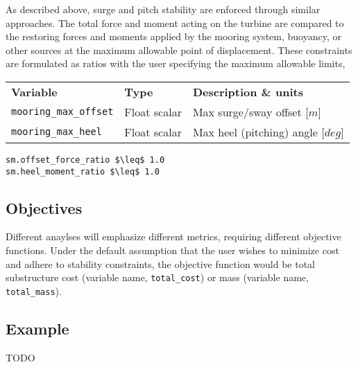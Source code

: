 As described above, surge and pitch stability are enforced through
similar approaches.  The total force and moment acting on the turbine
are compared to the restoring forces and moments applied by the mooring
system, buoyancy, or other sources at the maximum allowable point of
displacement.  These constraints are formulated as ratios with the user
specifying the maximum allowable limits,

{\footnotesize
  \begin{tabularx}{\linewidth}{ l l X }
    \textbf{Variable} & \textbf{Type} & \textbf{Description \& units} \\
    \texttt{mooring\_max\_offset} & Float scalar & Max surge/sway offset [$m$]\\
    \texttt{mooring\_max\_heel}   & Float scalar & Max heel (pitching) angle [$deg$]\\
  \end{tabularx}
}
\begin{lstlisting}
sm.offset_force_ratio $\leq$ 1.0
sm.heel_moment_ratio $\leq$ 1.0
\end{lstlisting}

\subsection{Objectives}
Different anaylses will emphasize different metrics, requiring different
objective functions.  Under the default assumption that the user wishes
to minimize cost and adhere to stability constraints, the objective
function would be total substructure cost (variable name,
\texttt{total\_cost}) or mass (variable name, \texttt{total\_mass}).

\subsection{Example}
TODO
